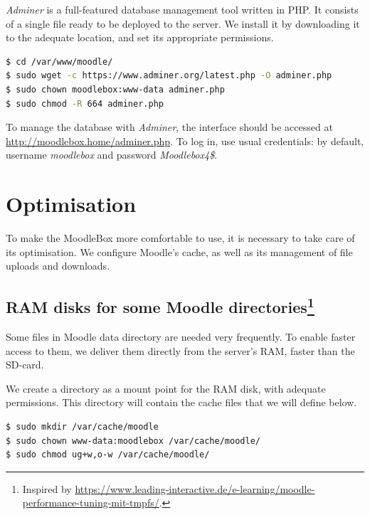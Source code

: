 \documentclass[12pt]{article}
\begin{document}
\textsl{Adminer} is a full-featured database management tool written in PHP. It consists of a single file ready to be deployed to the server.
We install it by downloading it to the adequate location, and set its appropriate permissions.
\begin{lstlisting}[language=bash]
$ cd /var/www/moodle/
$ sudo wget -c https://www.adminer.org/latest.php -O adminer.php
$ sudo chown moodlebox:www-data adminer.php
$ sudo chmod -R 664 adminer.php
\end{lstlisting}

To manage the database with \textsl{Adminer}, the interface should be accessed at \url{http://moodlebox.home/adminer.php}.
To log in, use usual credentials: by default, username \emph{moodlebox} and password \emph{Moodlebox4\$}.

\section{Optimisation}\label{sec-optimisation}

To make the MoodleBox more comfortable to use, it is necessary to take care of its optimisation.
We configure Moodle's cache, as well as its management of file uploads and downloads.

\subsection[RAM disks for some Moodle directories]{RAM disks for some Moodle directories\footnote{Inspired by \url{https://www.leading-interactive.de/e-learning/moodle-performance-tuning-mit-tmpfs/}.}}

Some files in Moodle data directory are needed very frequently.
To enable faster access to them, we deliver them directly from the server's RAM, faster than the SD-card.

We create a directory as a mount point for the RAM disk, with adequate permissions.
This directory will contain the cache files that we will define below. 
\begin{lstlisting}[language=bash]
$ sudo mkdir /var/cache/moodle
$ sudo chown www-data:moodlebox /var/cache/moodle/
$ sudo chmod ug+w,o-w /var/cache/moodle/
\end{lstlisting}
\end{document}
